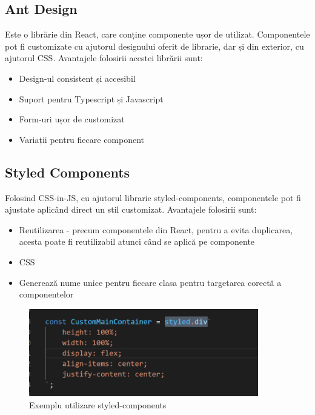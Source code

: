 \subsection{Ant Design}
Este o librărie din React, care conține componente ușor de utilizat.
Componentele pot fi customizate cu ajutorul designului oferit de librarie, dar și din exterior, cu ajutorul CSS.
Avantajele folosirii acestei librării sunt: 
\begin{itemize}
	\setlength\itemsep{0.5em}
    \item Design-ul consistent și accesibil
    \item Suport pentru Typescript și Javascript
    \item Form-uri ușor de customizat
    \item Variații pentru fiecare component
\end{itemize}
\subsection{Styled Components}
Folosind CSS-in-JS, cu ajutorul librarie styled-components, componentele pot fi ajustate aplicând direct un stil customizat.
Avantajele folosirii sunt:
\begin{itemize}
	\setlength\itemsep{0.5em}
    \item Reutilizarea - precum componentele din React, pentru a evita duplicarea, acesta poate fi reutilizabil atunci când se aplică pe componente
    \item CSS
    \item Generează nume unice pentru fiecare clasa pentru targetarea corectă a componentelor
\end{itemize}

\begin{figure}[ht]
	\centering
	\includegraphics[width=100mm, scale=2]{figs/styledcomp.png}
	\caption{Exemplu utilizare styled-components}
	\label{fig:styledcomp}
\end{figure}
